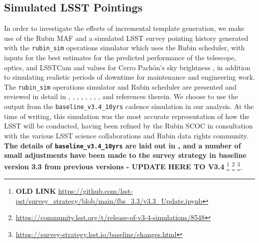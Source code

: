 \documentclass[preprint,linenumbers]{aastex631}
\newcommand{\baselinefull}{\texttt{baseline\_v3.4\_10yrs}\xspace}
\begin{document}
	\subsection{Simulated LSST Pointings}
	In order to investigate the effects of incremental template generation, we make use of the Rubin MAF \citep{2014SPIE.9149E..0BJ} and a simulated LSST survey pointing history generated with the \texttt{rubin\_sim} operations simulator which uses the Rubin scheduler, with inputs for the best estimates for the predicted performance of the telescope, optics, and LSSTCam and values for Cerro Pach{\'o}n's sky brightness \citep{Yoachim2016}, in addition to simulating realistic periods of downtime for maintenance and engineering work. The \texttt{rubin\_sim} operations simulator and Rubin scheduler are presented and reviewed in detail in \cite{2014SPIE.9150E..14C}, \cite{2014SPIE.9150E..15D}, \cite{2016SPIE.9910E..13D}, \cite{Yoachim2016},  \cite{lsstsciencecollaborationScienceDrivenOptimizationLSST2017},  \cite{2018Icar..303..181J}, \cite{2019AJ....157..151N}, \cite{jones_r_lynne_2020_4048838}, \cite{2022ApJS..258....1B} and references therein.  We choose to use the output from the \baselinefull cadence simulation \citep{v3.4sims} in our analysis. At the time of writing, this simulation was the most accurate representation of how the LSST will be conducted, having been refined by the Rubin SCOC in consultation with the various LSST science collaborations and Rubin data rights community. 
	\textbf{The details of \baselinefull are laid out in \cite{SCOC_Report_2}, and a number of small adjustments have been made to the survey strategy in baseline version 3.3 from previous versions - UPDATE HERE TO V3.4}
	\footnote{\textbf{OLD LINK} \url{https://github.com/lsst-pst/survey\_strategy/blob/main/fbs_3.3/v3.3_Update.ipynb}}
	\footnote{\url{https://community.lsst.org/t/release-of-v3-4-simulations/8548}}
	\footnote{\url{https://survey-strategy.lsst.io/baseline/changes.html}}. 
	
\end{document}
